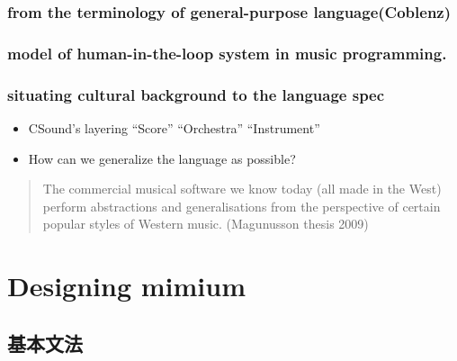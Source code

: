 \hypertarget{from-the-terminology-of-general-purpose-languagecoblenz}{%
\subsection{from the terminology of general-purpose
language(Coblenz)}\label{from-the-terminology-of-general-purpose-languagecoblenz}}

\hypertarget{model-of-human-in-the-loop-system-in-music-programming.}{%
\subsection{model of human-in-the-loop system in music
programming.}\label{model-of-human-in-the-loop-system-in-music-programming.}}

\hypertarget{situating-cultural-background-to-the-language-spec}{%
\subsection{situating cultural background to the language
spec}\label{situating-cultural-background-to-the-language-spec}}

\begin{itemize}
\tightlist
\item
  CSound's layering ``Score'' ``Orchestra'' ``Instrument''
\item
  How can we generalize the language as possible?
\end{itemize}

\begin{quote}
The commercial musical software we know today (all made in the West)
perform abstractions and generalisations from the perspective of certain
popular styles of Western music. (Magunusson thesis 2009)
\end{quote}

\hypertarget{designing-mimium}{%
\chapter{Designing mimium}\label{designing-mimium}}

\hypertarget{ux57faux672cux6587ux6cd5}{%
\section{基本文法}\label{ux57faux672cux6587ux6cd5}}

\begin{Shaded}
\begin{Highlighting}[]
\NormalTok{\}}
\end{Highlighting}
\end{Shaded}

